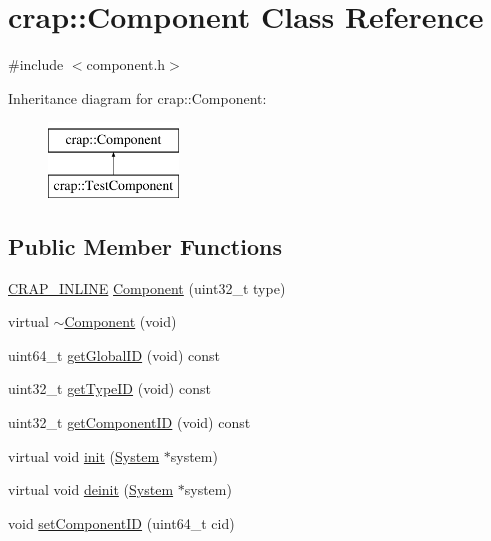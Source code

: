 \hypertarget{classcrap_1_1_component}{}\section{crap\+:\+:Component Class Reference}
\label{classcrap_1_1_component}


{\ttfamily \#include $<$component.\+h$>$}

Inheritance diagram for crap\+:\+:Component\+:\begin{figure}[H]
\begin{center}
\leavevmode
\includegraphics[height=2.000000cm]{classcrap_1_1_component}
\end{center}
\end{figure}
\subsection*{Public Member Functions}
\begin{DoxyCompactItemize}
\item 
\hyperlink{config__x86_8h_a5a40526b8d842e7ff731509998bb0f1c}{C\+R\+A\+P\+\_\+\+I\+N\+L\+I\+N\+E} \hyperlink{classcrap_1_1_component_a6cae4d7d57817d0b6c95e4cb174722ca}{Component} (uint32\+\_\+t type)
\item 
virtual \hyperlink{classcrap_1_1_component_a068c59cb0b693ecb20c202be1e13cfc0}{$\sim$\+Component} (void)
\item 
uint64\+\_\+t \hyperlink{classcrap_1_1_component_af4b373a3414de937ded0873db86d6dab}{get\+Global\+I\+D} (void) const 
\item 
uint32\+\_\+t \hyperlink{classcrap_1_1_component_aa48a066035f00a6f437d07a41350e7a7}{get\+Type\+I\+D} (void) const 
\item 
uint32\+\_\+t \hyperlink{classcrap_1_1_component_a573c62acbb360a1ece0ac7939fda072d}{get\+Component\+I\+D} (void) const 
\item 
virtual void \hyperlink{classcrap_1_1_component_a340d8982ca72efa1829503579781dcfe}{init} (\hyperlink{classcrap_1_1_system}{System} $\ast$system)
\item 
virtual void \hyperlink{classcrap_1_1_component_a3707330c1f62f960f0663bb67ad601bf}{deinit} (\hyperlink{classcrap_1_1_system}{System} $\ast$system)
\item 
void \hyperlink{classcrap_1_1_component_aff766785d59c81b6314b697aed19579d}{set\+Component\+I\+D} (uint64\+\_\+t cid)
\end{DoxyCompactItemize}
